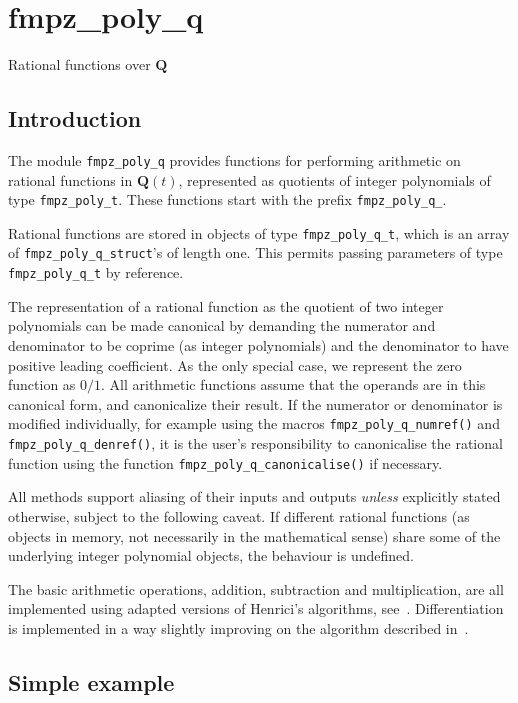 \documentclass[a4paper,10pt]{book}
\newcommand{\Q}{\mathbf{Q}}%
\newcommand{\code}{\lstinline}
\begin{document}
\chapter{fmpz\_poly\_q}
\epigraph{Rational functions over $\Q$}{}

\section{Introduction}

The module \code{fmpz_poly_q} provides functions for performing 
arithmetic on rational functions in $\mathbf{Q}(t)$, represented as 
quotients of integer polynomials of type \code{fmpz_poly_t}.  These 
functions start with the prefix \code{fmpz_poly_q_}.

Rational functions are stored in objects of type \code{fmpz_poly_q_t}, 
which is an array of \code{fmpz_poly_q_struct}'s of length one.  This 
permits passing parameters of type \code{fmpz_poly_q_t} by reference.  

The representation of a rational function as the quotient of two integer 
polynomials can be made canonical by demanding the numerator and 
denominator to be coprime (as integer polynomials) and the denominator to 
have positive leading coefficient.  As the only special case, we represent 
the zero function as $0/1$.  All arithmetic functions assume that the 
operands are in this canonical form, and canonicalize their result.  If the 
numerator or denominator is modified individually, for example using the 
macros \code{fmpz_poly_q_numref()} and \code{fmpz_poly_q_denref()}, 
it is the user's responsibility to canonicalise the rational function 
using the function \code{fmpz_poly_q_canonicalise()} if necessary.

All methods support aliasing of their inputs and outputs \emph{unless} 
explicitly stated otherwise, subject to the following caveat.  If 
different rational functions (as objects in memory, not necessarily in the 
mathematical sense) share some of the underlying integer polynomial 
objects, the behaviour is undefined.

The basic arithmetic operations, addition, subtraction and multiplication, 
are all implemented using adapted versions of Henrici's algorithms, 
see~\citep{Hen1956}.  Differentiation is implemented in a way slightly 
improving on the algorithm described in~\citep{Hor1972}.

\section{Simple example}
\end{document}
